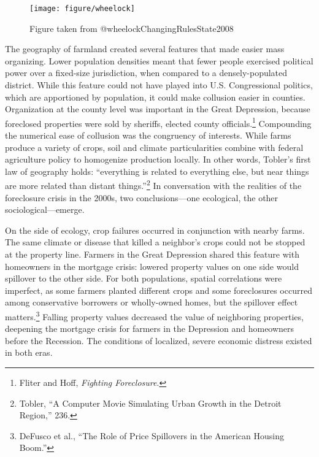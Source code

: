 \documentclass[
]{article}
\let\rmarkdownfootnote\footnote%
\def\footnote{\protect\rmarkdownfootnote}
\begin{document}
\begin{figure}

{\centering \texttt{[image: figure/wheelock]} 

}

\caption{Figure taken from @wheelockChangingRulesState2008}\label{fig:wheelock-farms}
\end{figure}

The geography of farmland created several features that made easier mass
organizing. Lower population densities meant that fewer people exercised
political power over a fixed-size jurisdiction, when compared to a
densely-populated district. While this feature could not have played
into U.S. Congressional politics, which are apportioned by population,
it could make collusion easier in counties. Organization at the county
level was important in the Great Depression, because foreclosed
properties were sold by sheriffs, elected county officials.\footnote{Fliter
  and Hoff, \emph{Fighting Foreclosure}.} Compounding the numerical ease
of collusion was the congruency of interests. While farms produce a
variety of crops, soil and climate particularities combine with federal
agriculture policy to homogenize production locally. In other words,
Tobler's first law of geography holds: ``everything is related to
everything else, but near things are more related than distant
things.''\footnote{Tobler, ``A Computer Movie Simulating Urban Growth in
  the Detroit Region,'' 236.} In conversation with the realities of the
foreclosure crisis in the 2000s, two conclusions---one ecological, the
other sociological---emerge.

On the side of ecology, crop failures occurred in conjunction with
nearby farms. The same climate or disease that killed a neighbor's crops
could not be stopped at the property line. Farmers in the Great
Depression shared this feature with homeowners in the mortgage crisis:
lowered property values on one side would spillover to the other side.
For both populations, spatial correlations were imperfect, as some
farmers planted different crops and some foreclosures occurred among
conservative borrowers or wholly-owned homes, but the spillover effect
matters.\footnote{DeFusco et al., ``The Role of Price Spillovers in the
  American Housing Boom.''} Falling property values decreased the value
of neighboring properties, deepening the mortgage crisis for farmers in
the Depression and homeowners before the Recession. The conditions of
localized, severe economic distress existed in both eras.
\end{document}
